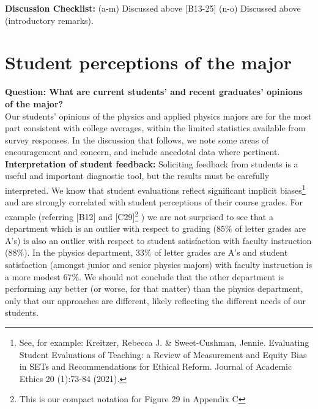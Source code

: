 \documentclass[12pt]{article}
\begin{document}
\noindent
{\bf Discussion Checklist:} (a-m) Discussed above [B13-25] (n-o)
Discussed above (introductory remarks).

\newpage
\section{Student perceptions of the major}
\label{sec:perceptions}

{\bf Question: What are current students' and recent graduates'
  opinions of the major? }\\
  
\noindent
Our students' opinions of the physics and applied physics majors are
for the most part consistent with college averages, within the limited
statistics available from survey responses.  In the discussion that
follows, we note some areas of encouragement and concern, and include
anecdotal data where pertinent.\\[3pt]

\noindent
{\bf Interpretation of student feedback:} Soliciting feedback from
students is a useful and important diagnostic tool, but the results
must be carefully interpreted.  We know that student evaluations
reflect significant implicit biases\footnote{See, for example:
  Kreitzer, Rebecca J. \& Sweet-Cushman, Jennie. Evaluating Student
  Evaluations of Teaching: a Review of Measurement and Equity Bias in
  SETs and Recommendations for Ethical Reform. Journal of Academic
  Ethics 20 (1):73-84 (2021).}  and are strongly correlated with
student perceptions of their course grades.  For example (referring
[B12] and [C29]\footnote{This is our compact notation for Figure 29 in Appendix C} 
 ) we are not surprised to see that a department which
is an outlier with respect to grading ($85\%$ of letter grades are
A's) is also an outlier with respect to student satisfaction with
faculty instruction ($88\%$).  In the physics department, $33\%$ of
letter grades are A's and student satisfaction (amongst junior and
senior physics majors) with faculty instruction is a more modest
$67\%$.  We should not conclude that the other department is
performing any better (or worse, for that matter) than the physics
department, only that our approaches are different, likely reflecting
the different needs of our students.\\[3pt]
\end{document}
